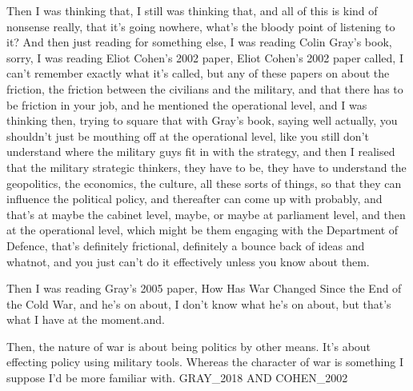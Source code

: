 Then I was thinking that, I still was thinking that, and all of this is kind of nonsense really, that it’s going nowhere, what’s the bloody point of listening to it? And then just reading for something else, I was reading Colin Gray’s book, sorry, I was reading Eliot Cohen’s 2002 paper, Eliot Cohen’s 2002 paper called, I can’t remember exactly what it’s called, but any of these papers on about the friction, the friction between the civilians and the military, and that there has to be friction in your job, and he mentioned the operational level, and I was thinking then, trying to square that with Gray’s book, saying well actually, you shouldn’t just be mouthing off at the operational level, like you still don’t understand where the military guys fit in with the strategy, and then I realised that the military strategic thinkers, they have to be, they have to understand the geopolitics, the economics, the culture, all these sorts of things, so that they can influence the political policy, and thereafter can come up with probably, and that’s at maybe the cabinet level, maybe, or maybe at parliament level, and then at the operational level, which might be them engaging with the Department of Defence, that’s definitely frictional, definitely a bounce back of ideas and whatnot, and you just can’t do it effectively unless you know about them.

Then I was reading Gray’s 2005 paper, How Has War Changed Since the End of the Cold War, and he’s on about, I don’t know what he’s on about, but that’s what I have at the moment.and.

Then, the nature of war is about being politics by other means. It's about effecting policy using military tools. Whereas the character of war is something I suppose I'd be more familiar with. GRAY_2018 AND COHEN_2002	

